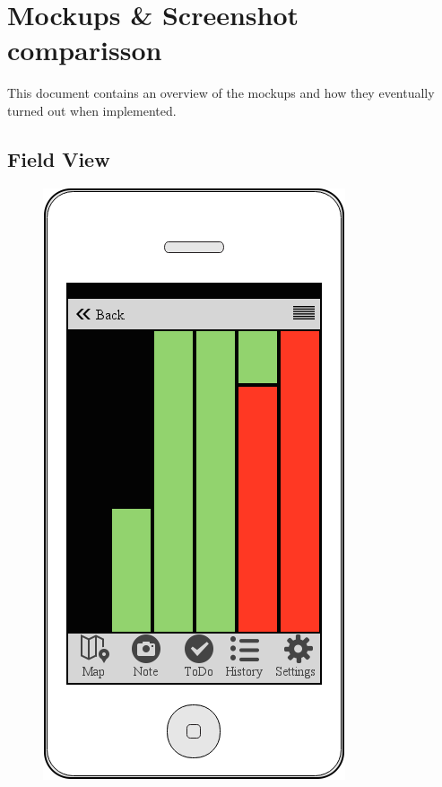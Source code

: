 \documentclass[12pt]{article}
\begin{document}
	\pagebreak
	
	\tableofcontents
	\clearpage

\section{Mockups \& Screenshot comparisson}
This document contains an overview of the mockups and how they eventually turned out when implemented.
\subsection{Field View}
\begin{figure}[ht]
	\centering
	\includegraphics[width=\linewidth, height=0.4\textheight, keepaspectratio=true]{screenshots/Grutto.png}

\end{figure}
\end{document}
